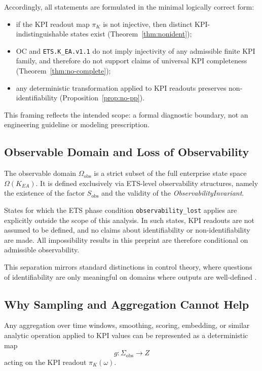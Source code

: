 Accordingly, all statements are formulated in the minimal logically correct
form:
\begin{itemize}[leftmargin=2em]
  \item if the KPI readout map \(\pi_K\) is not injective, then distinct
        KPI-indistinguishable states exist
        (Theorem~\ref{thm:nonident});
  \item OC and \texttt{ETS.K\_EA.v1.1} do not imply injectivity of any admissible
        finite KPI family, and therefore do not support claims of universal KPI
        completeness
        (Theorem~\ref{thm:no-complete});
  \item any deterministic transformation applied to KPI readouts preserves
        non-identifiability
        (Proposition~\ref{prop:no-pp}).
\end{itemize}

This framing reflects the intended scope: a formal diagnostic boundary, not an
engineering guideline or modeling prescription.

\subsection{Observable Domain and Loss of Observability}

The observable domain \(\Omega_{\mathrm{obs}}\) is a strict subset of the full
enterprise state space \(\Omega(K_{EA})\).
It is defined exclusively via ETS-level observability structures, namely the
existence of the factor \(S_{\mathrm{obs}}\) and the validity of the
\emph{ObservabilityInvariant}.

States for which the ETS phase condition \texttt{observability\_lost} applies
are explicitly outside the scope of this analysis.
In such states, KPI readouts are not assumed to be defined, and no claims about
identifiability or non-identifiability are made.
All impossibility results in this preprint are therefore conditional on
admissible observability.

This separation mirrors standard distinctions in control theory, where
questions of identifiability are only meaningful on domains where outputs are
well-defined \cite{kalman1960}.

\subsection{Why Sampling and Aggregation Cannot Help}

Any aggregation over time windows, smoothing, scoring, embedding, or similar
analytic operation applied to KPI values can be represented as a deterministic
map
\[
g:\Sigma_{\mathrm{obs}}\to Z
\]
acting on the KPI readout \(\pi_K(\omega)\).

